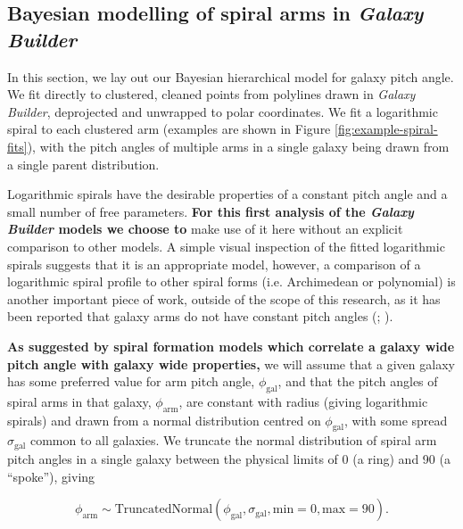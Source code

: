 \subsection{Bayesian modelling of spiral arms in \textit{Galaxy Builder}}
\label{section:bhsm-model}
In this section, we lay out our Bayesian hierarchical model for galaxy pitch angle. We fit directly to clustered, cleaned points from polylines drawn in \textit{Galaxy Builder}, deprojected and unwrapped to polar coordinates. We fit a logarithmic spiral to each clustered arm (examples are shown in Figure \ref{fig:example-spiral-fits}), with the pitch angles of multiple arms in a single galaxy being drawn from a single parent distribution.

Logarithmic spirals have the desirable properties of a constant pitch angle and a small number of free parameters. \textbf{For this first analysis of the \textit{Galaxy Builder} models we choose to} make use of it here without an explicit comparison to other models. A simple visual inspection of the fitted logarithmic spirals suggests that it is an appropriate model, however, a comparison of a logarithmic spiral profile to other spiral forms (i.e. Archimedean or polynomial) is another important piece of work, outside of the scope of this research, as it has been reported that galaxy arms do not have constant pitch angles (\citealt{1981AJ.....86.1847K}; \citealt{2009MNRAS.397..164R}).

\textbf{As suggested by spiral formation models which correlate a galaxy wide pitch angle with galaxy wide properties,} we will assume that a given galaxy has some preferred value for arm pitch angle, $\phi_\mathrm{gal}$, and that the pitch angles of spiral arms in that galaxy, $\phi_\mathrm{arm}$, are constant with radius (giving logarithmic spirals) and drawn from a normal distribution centred on $\phi_\mathrm{gal}$, with some spread $\sigma_\mathrm{gal}$ common to all galaxies. We truncate the normal distribution of spiral arm pitch angles in a single galaxy between the physical limits of {0\degree} (a ring) and {90\degree} (a ``spoke''), giving

\begin{equation}
\phi_\mathrm{arm} \sim \mathrm{TruncatedNormal}(\phi_\mathrm{gal}, \sigma_\mathrm{gal}, \mathrm{min}=0, \mathrm{max}=90).
\end{equation}

